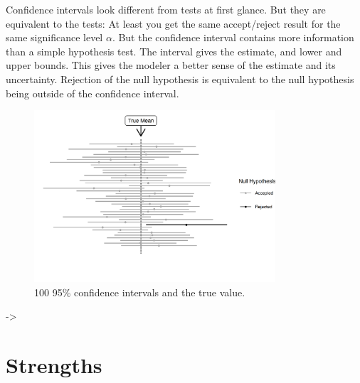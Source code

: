 \documentclass[
  10pt,
]{scrbook}
\begin{document}
Confidence intervals look different from tests at first glance.
But they are equivalent to the tests:
At least you get the same accept/reject result for the same significance level \(\alpha\).
But the confidence interval contains more information than a simple hypothesis test.
The interval gives the estimate, and lower and upper bounds.
This gives the modeler a better sense of the estimate and its uncertainty.
Rejection of the null hypothesis is equivalent to the null hypothesis being outside of the confidence interval.

\begin{figure}

{\centering \includegraphics[width=0.8\textwidth]{figures/ci-1} 

}

\caption{100 95\% confidence intervals and the true value.}\label{fig:ci}
\end{figure}

-\textgreater{}

\hypertarget{strengths-1}{%
\section{Strengths}\label{strengths-1}}
\end{document}
